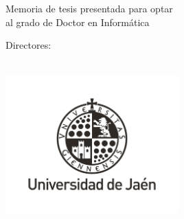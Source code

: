 \begin{center}
    \null\vspace{8mm}
    
    \libertineNormalCapital
    {
        \huge 
        \textcolor{redThesis}{
            \textls[30]
            {
                \titleSpanish
            }
        }
    
        \vspace{5mm}
        
        \Large
        \authorship
    }
    
    \vspace{5mm}
    
    \libertineNormal
    {
        \Large 
        Memoria de tesis presentada para optar\\
        \minorSpacing
        al grado de Doctor en Informática
    }
    
    \vspace{8mm}
    
    {
       \libertineNormalCapital
       \Large 
       Directores:\\
    
       \libertineNormal
       \mainSupervisor\\
       \minorSpacing
       \secondSupervisor
    }
    
    \vspace{15mm}
    
    \includegraphics[width=0.5\textwidth]{images/Uja/UjaPhDBlack.jpg}
    
    \vspace{3mm}
    
    {
        \libertineNormal
        \Large 
        \department\\
        \minorSpacing
        \polytechnicSchool\\
        \minorSpacing
        \university\\
    
        \vspace{12mm}
        \dateDissertationSpanish
    }
    
    \libertineNormal
    \newpage
\end{center}